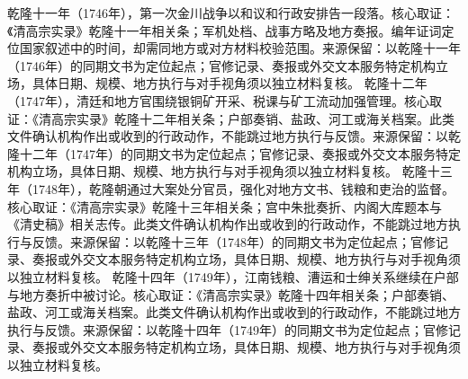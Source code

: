 乾隆十一年（1746年），第一次金川战争以和议和行政安排告一段落。核心取证：《清高宗实录》乾隆十一年相关条；军机处档、战事方略及地方奏报。编年证词定位国家叙述中的时间，却需同地方或对方材料校验范围。来源保留：以乾隆十一年（1746年）的同期文书为定位起点；官修记录、奏报或外交文本服务特定机构立场，具体日期、规模、地方执行与对手视角须以独立材料复核。
乾隆十二年（1747年），清廷和地方官围绕银铜矿开采、税课与矿工流动加强管理。核心取证：《清高宗实录》乾隆十二年相关条；户部奏销、盐政、河工或海关档案。此类文件确认机构作出或收到的行政动作，不能跳过地方执行与反馈。来源保留：以乾隆十二年（1747年）的同期文书为定位起点；官修记录、奏报或外交文本服务特定机构立场，具体日期、规模、地方执行与对手视角须以独立材料复核。
乾隆十三年（1748年），乾隆朝通过大案处分官员，强化对地方文书、钱粮和吏治的监督。核心取证：《清高宗实录》乾隆十三年相关条；宫中朱批奏折、内阁大库题本与《清史稿》相关志传。此类文件确认机构作出或收到的行政动作，不能跳过地方执行与反馈。来源保留：以乾隆十三年（1748年）的同期文书为定位起点；官修记录、奏报或外交文本服务特定机构立场，具体日期、规模、地方执行与对手视角须以独立材料复核。
乾隆十四年（1749年），江南钱粮、漕运和士绅关系继续在户部与地方奏折中被讨论。核心取证：《清高宗实录》乾隆十四年相关条；户部奏销、盐政、河工或海关档案。此类文件确认机构作出或收到的行政动作，不能跳过地方执行与反馈。来源保留：以乾隆十四年（1749年）的同期文书为定位起点；官修记录、奏报或外交文本服务特定机构立场，具体日期、规模、地方执行与对手视角须以独立材料复核。
